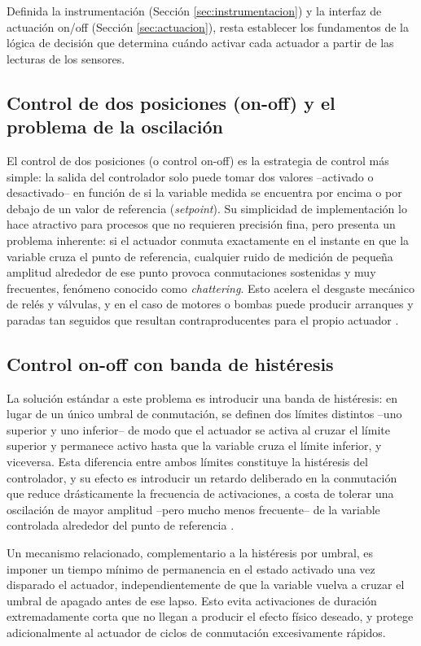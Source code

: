Definida la instrumentación (Sección \ref{sec:instrumentacion}) y la interfaz de actuación on/off (Sección \ref{sec:actuacion}), resta establecer los fundamentos de la lógica de decisión que determina cuándo activar cada actuador a partir de las lecturas de los sensores.

\subsection{Control de dos posiciones (on-off) y el problema de la oscilación}

El control de dos posiciones (o control on-off) es la estrategia de control más simple: la salida del controlador solo puede tomar dos valores --activado o desactivado-- en función de si la variable medida se encuentra por encima o por debajo de un valor de referencia (\textit{setpoint}). Su simplicidad de implementación lo hace atractivo para procesos que no requieren precisión fina, pero presenta un problema inherente: si el actuador conmuta exactamente en el instante en que la variable cruza el punto de referencia, cualquier ruido de medición de pequeña amplitud alrededor de ese punto provoca conmutaciones sostenidas y muy frecuentes, fenómeno conocido como \textit{chattering}. Esto acelera el desgaste mecánico de relés y válvulas, y en el caso de motores o bombas puede producir arranques y paradas tan seguidos que resultan contraproducentes para el propio actuador \cite{ogata2010, kuo1996}.

\subsection{Control on-off con banda de histéresis}
\label{subsec:histeresis}

La solución estándar a este problema es introducir una banda de histéresis: en lugar de un único umbral de conmutación, se definen dos límites distintos --uno superior y uno inferior-- de modo que el actuador se activa al cruzar el límite superior y permanece activo hasta que la variable cruza el límite inferior, y viceversa. Esta diferencia entre ambos límites constituye la histéresis del controlador, y su efecto es introducir un retardo deliberado en la conmutación que reduce drásticamente la frecuencia de activaciones, a costa de tolerar una oscilación de mayor amplitud --pero mucho menos frecuente-- de la variable controlada alrededor del punto de referencia \cite{ogata2010, kuo1996}.

Un mecanismo relacionado, complementario a la histéresis por umbral, es imponer un tiempo mínimo de permanencia en el estado activado una vez disparado el actuador, independientemente de que la variable vuelva a cruzar el umbral de apagado antes de ese lapso. Esto evita activaciones de duración extremadamente corta que no llegan a producir el efecto físico deseado, y protege adicionalmente al actuador de ciclos de conmutación excesivamente rápidos.

